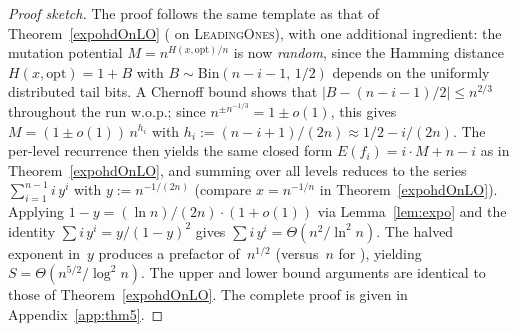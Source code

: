 %

\begin{proof}[Proof sketch]
The proof follows the same template as that of Theorem~\ref{expohdOnLO}
({\expoF} on \textsc{LeadingOnes}), with one additional ingredient: the
mutation potential $M = n^{H(x,\text{opt})/n}$ is now \emph{random}, since
the Hamming distance $H(x,\text{opt}) = 1 + B$ with
$B\sim\mathrm{Bin}(n{-}i{-}1,\,1/2)$ depends on the uniformly distributed
tail bits.  A Chernoff bound shows that $|B - (n{-}i{-}1)/2| \le n^{2/3}$
throughout the run w.o.p.; since $n^{\pm n^{-1/3}} = 1 \pm o(1)$, this
gives $M = (1\pm o(1))\,n^{h_i}$ with
$h_i := (n{-}i{+}1)/(2n) \approx 1/2 - i/(2n)$.
The per-level recurrence then yields the same closed form
$E(f_i) = i\cdot M + n - i$ as in Theorem~\ref{expohdOnLO}, and summing
over all levels reduces to the series
$\sum_{i=1}^{n-1} i\,y^i$ with $y := n^{-1/(2n)}$ (compare
$x = n^{-1/n}$ in Theorem~\ref{expohdOnLO}).  Applying
$1 - y = (\ln n)/(2n)\cdot(1{+}o(1))$ via Lemma~\ref{lem:expo} and the
identity $\sum i\,y^i = y/(1{-}y)^2$ gives
$\sum i\,y^i = \Theta(n^2/\ln^2 n)$.  The halved exponent in~$y$ produces
a prefactor of~$n^{1/2}$ (versus~$n$ for {\expoF}), yielding
$S = \Theta(n^{5/2}/\log^2 n)$.  The upper and lower bound arguments
are identical to those of Theorem~\ref{expohdOnLO}.
The complete proof is given in Appendix~\ref{app:thm5}.
\end{proof}
